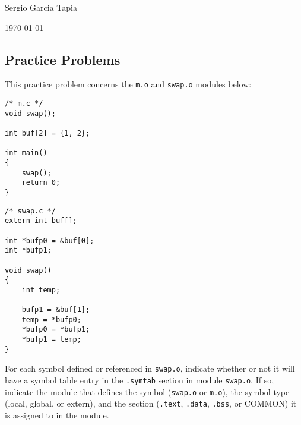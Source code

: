 \documentclass[12pt]{article}
\newenvironment{ex}[2][Exercise]{\begin{trivlist}
		\item[\hskip \labelsep {\bfseries #1}\hskip \labelsep {\bfseries #2.}]}{\end{trivlist}}
\begin{document}

\noindent Sergio Garcia Tapia \hfill

 \hfill


\noindent\today

\subsection*{Practice Problems}

\begin{ex}{7.1}
	This practice problem concerns the \texttt{m.o} and \texttt{swap.o} modules below:
	\begin{lstlisting}
/* m.c */
void swap();

int buf[2] = {1, 2};

int main()
{
	swap();
	return 0;
}
	\end{lstlisting}
	\begin{lstlisting}
/* swap.c */
extern int buf[];

int *bufp0 = &buf[0];
int *bufp1;

void swap()
{
	int temp;
	
	bufp1 = &buf[1];
	temp = *bufp0;
	*bufp0 = *bufp1;
	*bufp1 = temp;
}
	\end{lstlisting}
	For each symbol defined or referenced in \texttt{swap.o}, indicate whether or not it will have a symbol
	table entry in the \texttt{.symtab} section in module \texttt{swap.o}. If so, indicate the module that
	defines the symbol (\texttt{swap.o} or \texttt{m.o}), the symbol type (local, global, or extern),
	and the section (\texttt{.text}, \texttt{.data}, \texttt{.bss}, or COMMON) it is assigned to
	in the module.
\end{ex}
\end{document}
